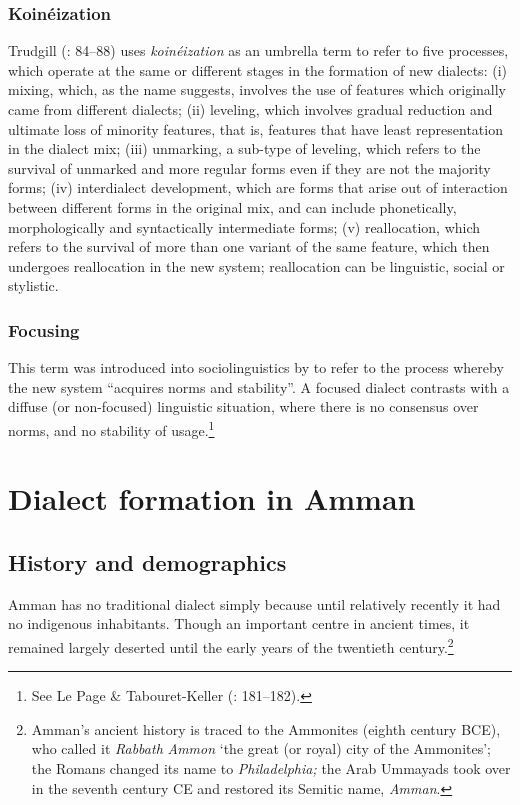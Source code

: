 \documentclass[output=paper]{langsci/langscibook}
\begin{document}
\subsubsection{Koinéization}

Trudgill (\citeyear{Trudgill2004}: 84–88) uses \textit{koinéization} as an umbrella term to refer to five processes, which operate at the same or different stages in the formation of new dialects: (i) mixing, which, as the name suggests, involves the use of features which originally came from different dialects; (ii) leveling, which involves gradual reduction and ultimate loss of minority features, that is, features that have least representation in the dialect mix; (iii) unmarking, a sub-type of leveling, which refers to the survival of unmarked and more regular forms even if they are not the majority forms; (iv) interdialect development, which are forms that arise out of interaction between different forms in the original mix, and can include phonetically, morphologically and syntactically  intermediate forms; (v) reallocation, which refers to the survival of more than one variant of the same feature, which then undergoes reallocation in the new system; reallocation can be linguistic, social or stylistic.

\subsubsection{Focusing} \label{focus}

This term was introduced into sociolinguistics by \citet{LePageTabouret-Keller1985} to refer to the process whereby the new system “acquires norms and stability”. A focused dialect contrasts with a diffuse (or non-focused) linguistic situation, where there is no consensus over norms, and no stability of usage.\footnote{See Le Page \& Tabouret-Keller (\citeyear{LePageTabouret-Keller1985}: 181–182).}

\section{Dialect formation in Amman}

\subsection{History and demographics}

Amman has no traditional dialect simply because until relatively recently it had no indigenous inhabitants. Though an important centre in ancient times, it remained largely deserted until the early years of the twentieth century.\footnote{Amman’s ancient history is traced to the Ammonites (eighth century BCE), who called it \textit{Rabbath} \textit{Ammon} ‘the great (or royal) city of the Ammonites’; the Romans changed its name to \textit{Philadelphia;} the Arab Ummayads took over in the seventh century CE and restored its Semitic name, \textit{Amman}.}
\end{document}
